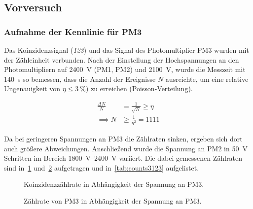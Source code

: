 \documentclass[slug=LM, room=Andreas-Schubert-Bau\,\ K\ 1A, supervisor=Anne-Sophie\ Berthold, coursedate=13.\ 12.\ 2019]{../../Lab_Report_LaTeX/lab_report}
\begin{document}
\subsection{Vorversuch}
\label{sec:vorvers}
\subsubsection{Aufnahme der Kennlinie f\"ur PM3}
\label{sec:pm3kenn}

Das Koinzidenzsignal (\textit{123}) und das Signal des
Photomultiplier PM3 wurden mit der Z\"ahleinheit verbunden.  Nach der
Einstellung der Hochspannungen an den Photomultipliern auf
\SI{2400}{\volt} (PM1, PM2) und \SI{2100}{\volt}, wurde die Messzeit
mit \SI{140}{\second} so bemessen, dass die Anzahl der Ereignisse
\(N\) ausreichte, um eine relative Ungenauigkeit von
\(\eta \leq \SI{3}{\percent})\) zu erreichen (Poisson-Verteilung).

\begin{align}
\label{eq:mtime}
\frac{\Delta N}{N} &= \frac{1}{\sqrt{N}} \geq \eta \\
\implies N &\geq \frac{1}{\eta^2} = 1111
\end{align}

Da bei geringeren Spannungen an PM3 die Z\"ahlraten sinken, ergeben
sich dort auch gr\"o\ss{}ere Abweichungen.  Anschließend wurde die
Spannung an PM2 in \SI{50}{\volt} Schritten im Bereich
\SIrange{1800}{2400}{\volt} variiert.  Die dabei gemessenen
Z\"ahlraten sind in~\ref{fig:vorversuch-kennlinie_123}
und~\ref{fig:vorversuch-kennlinie_pm3} aufgetragen und
in~\ref{tab:counts3123} aufgelistet.

\begin{figure}[h]\centering
  
  \caption{Koinzidenzz\"ahlrate in Abh\"angigkeit der Spannung an PM3.}
  \label{fig:vorversuch-kennlinie_123}
\end{figure}

\begin{figure}[h]\centering
  
  \caption{Z\"ahlrate von PM3 in Abh\"angigkeit der Spannung an PM3.}
  \label{fig:vorversuch-kennlinie_pm3}
\end{figure}
\end{document}
